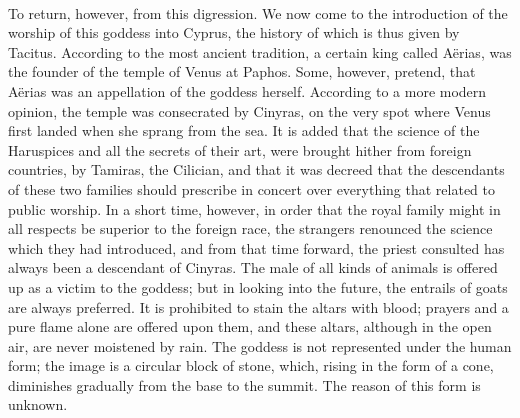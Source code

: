 \documentclass[a4paper, 11pt, oneside, polutonikogreek, english]{article}
\begin{document}
\paragraph{}
To return, however, from this digression. We now come to the introduction of the worship of this goddess into Cyprus, the history of which is thus given by Tacitus. According to the most ancient tradition, a certain king called Aërias, was the founder of the temple of Venus at Paphos. Some, however, pretend, that Aërias was an appellation of the goddess herself. According to a more modern opinion, the temple was consecrated by Cinyras, on the very spot where Venus first landed when she sprang from the sea. It is added that the science of the Haruspices and all the secrets of their art, were brought hither from foreign countries, by Tamiras, the Cilician, and that it was decreed that the descendants of these two families should prescribe in concert over everything that related to public worship. In a short time, however, in order that the royal family might in all respects be superior to the foreign race, the strangers renounced the science which they had introduced, and from that time forward, the priest consulted has always been a descendant of Cinyras. The male of all kinds of animals is offered up as a victim to the goddess; but in looking into the future, the entrails of goats are always preferred. It is prohibited to stain the altars with blood; prayers and a pure flame alone are offered upon them, and these altars, although in the open air, are never moistened by rain. The goddess is not represented under the human form; the image is a circular block of stone, which, rising in the form of a cone, diminishes gradually from the base to the summit. The reason of this form is unknown.
\end{document}
